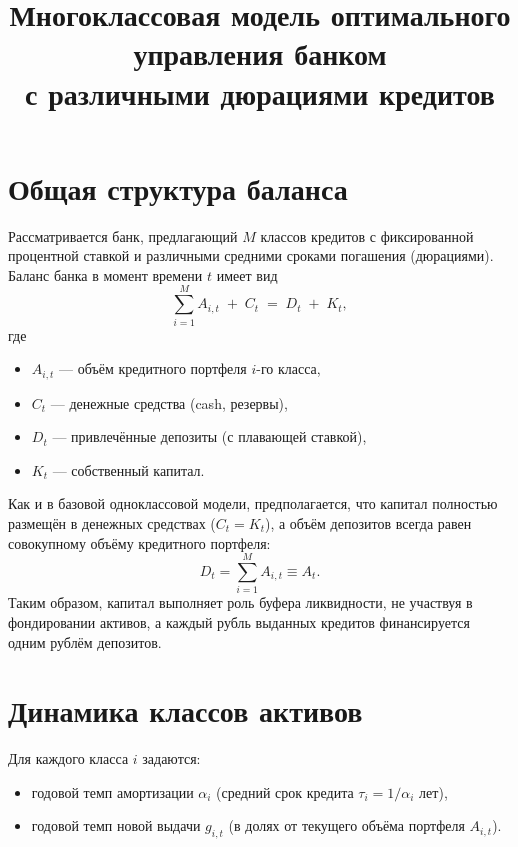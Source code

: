 \documentclass[11pt,a4paper]{article}
\title{Многоклассовая модель оптимального управления банком\\с различными дюрациями кредитов}
\author{}
\date{}
\newcommand{\1}{\mathbf{1}}
\begin{document}
\maketitle

\section{Общая структура баланса}

Рассматривается банк, предлагающий $M$ классов кредитов с фиксированной процентной ставкой и различными средними сроками погашения (дюрациями).
Баланс банка в момент времени $t$ имеет вид
\begin{equation}
    \sum_{i=1}^{M} A_{i,t} \;+\; C_t \;=\; D_t \;+\; K_t,
\end{equation}
где
\begin{itemize}[noitemsep]
    \item $A_{i,t}$ --- объём кредитного портфеля $i$-го класса,
    \item $C_t$ --- денежные средства (cash, резервы),
    \item $D_t$ --- привлечённые депозиты (с плавающей ставкой),
    \item $K_t$ --- собственный капитал.
\end{itemize}

Как и в базовой одноклассовой модели, предполагается, что капитал полностью размещён в денежных средствах ($C_t = K_t$), а объём депозитов всегда равен совокупному объёму кредитного портфеля:
\begin{equation}
    D_t = \sum_{i=1}^{M} A_{i,t} \equiv A_t.
\end{equation}
Таким образом, капитал выполняет роль буфера ликвидности, не участвуя в фондировании активов, а каждый рубль выданных кредитов финансируется одним рублём депозитов.

\section{Динамика классов активов}

Для каждого класса $i$ задаются:
\begin{itemize}[noitemsep]
    \item годовой темп амортизации $\alpha_i$ (средний срок кредита $\tau_i = 1/\alpha_i$ лет),
    \item годовой темп новой выдачи $g_{i,t}$ (в долях от текущего объёма портфеля $A_{i,t}$).
\end{itemize}
\end{document}
